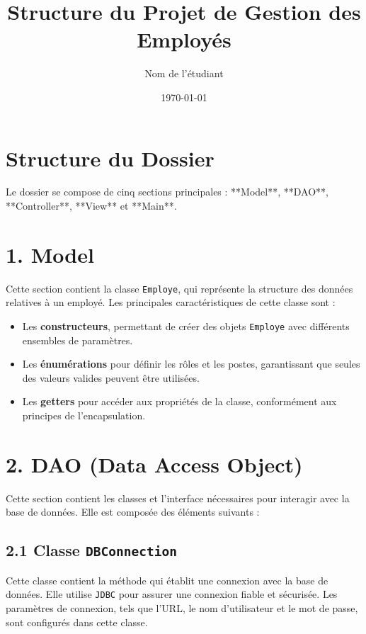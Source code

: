 \documentclass[a4paper,12pt]{report}
\title{\textbf{Structure du Projet de Gestion des Employés}}
\author{Nom de l'étudiant}
\date{\today}
\begin{document}
\maketitle

\section*{\textcolor{myblue}{Structure du Dossier}}

Le dossier se compose de cinq sections principales : **Model**, **DAO**, **Controller**, **View** et **Main**.

\section*{\textcolor{myblue}{1. Model}}

Cette section contient la classe \texttt{Employe}, qui représente la structure des données relatives à un employé. Les principales caractéristiques de cette classe sont :

\begin{itemize}
    \item Les \textbf{constructeurs}, permettant de créer des objets \texttt{Employe} avec différents ensembles de paramètres.
    \item Les \textbf{énumérations} pour définir les rôles et les postes, garantissant que seules des valeurs valides peuvent être utilisées.
    \item Les \textbf{getters} pour accéder aux propriétés de la classe, conformément aux principes de l'encapsulation.
\end{itemize}

\section*{\textcolor{myblue}{2. DAO (Data Access Object)}}

Cette section contient les classes et l'interface nécessaires pour interagir avec la base de données. Elle est composée des éléments suivants :

\subsection*{\textcolor{mygreen}{2.1 Classe \texttt{DBConnection}}}
Cette classe contient la méthode qui établit une connexion avec la base de données. Elle utilise \texttt{JDBC} pour assurer une connexion fiable et sécurisée. Les paramètres de connexion, tels que l'URL, le nom d'utilisateur et le mot de passe, sont configurés dans cette classe.
\end{document}
